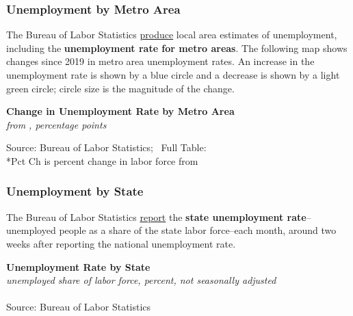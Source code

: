 \documentclass{report}
\newcommand{\tbllink}[1]{\href{https://raw.githubusercontent.com/bdecon/US-chartbook/master/chartbook/data/#1}{\faTable}}
\begin{document}
{\begin{minipage}{0.76\textwidth}
\subsubsection*{Unemployment by Metro Area}
\vspace{-1mm}

\small The Bureau of Labor Statistics \href{https://www.bls.gov/lau/}{produce} local area estimates of unemployment, including the \textbf{unemployment rate for metro areas}. The following map shows changes since 2019 in metro area unemployment rates. An increase in the unemployment rate is shown by a blue circle and a decrease is shown by a light green circle; circle size is the magnitude of the change. 


\end{minipage}
\vspace{1mm}

\begin{minipage}{0.82\textwidth}
\normalsize \textbf{Change in Unemployment Rate by Metro Area}\\
\footnotesize{\textit{from \unskip, percentage points}}
\vspace{-3mm}

\hspace*{-8mm} 
\vspace{-3mm}

\footnotesize{Source: Bureau of Labor Statistics; \ Full Table: \tbllink{msa_unemp_rate.csv} \\ \**Pct Ch is percent change in labor force from }
\end{minipage}
\newpage
\begin{minipage}{0.76\textwidth}
\subsubsection*{Unemployment by State}
\small The Bureau of Labor Statistics \href{https://www.bls.gov/lau/}{report} the \textbf{state unemployment rate}--unemployed people as a share of the state labor force--each month, around two weeks after reporting the national unemployment rate. 

\normalsize \textbf{Unemployment Rate by State}\\
\footnotesize{\textit{unemployed share of labor force, percent, not seasonally adjusted}}\\
\vspace{-2mm}
\hspace{-10mm}  \\
\footnotesize{Source: Bureau of Labor Statistics} \hspace{72mm} \tbllink{state_unrate.csv}
\end{minipage}
\newpage
\begin{minipage}{0.76\textwidth}

\end{minipage}}
\end{document}
